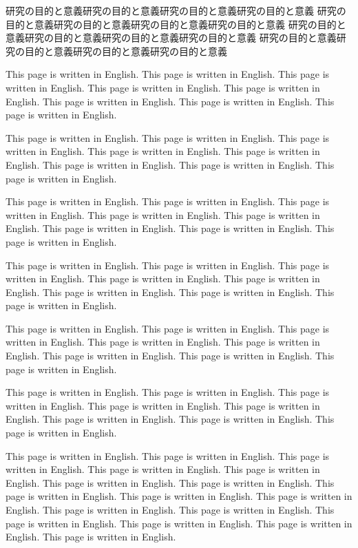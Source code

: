 \documentclass[12pt,dvipdfmx]{jarticle} %
\begin{document}
研究の目的と意義研究の目的と意義研究の目的と意義研究の目的と意義 
研究の目的と意義研究の目的と意義研究の目的と意義研究の目的と意義 
研究の目的と意義研究の目的と意義研究の目的と意義研究の目的と意義 
研究の目的と意義研究の目的と意義研究の目的と意義研究の目的と意義 


\newpage

This page is written in English. This page is written in English. 
This page is written in English. This page is written in English. 
This page is written in English. This page is written in English. 
This page is written in English. This page is written in English. 

This page is written in English. This page is written in English. 
This page is written in English. This page is written in English. 
This page is written in English. This page is written in English. 
This page is written in English. This page is written in English. 

This page is written in English. This page is written in English. 
This page is written in English. This page is written in English. 
This page is written in English. This page is written in English. 
This page is written in English. This page is written in English. 

This page is written in English. This page is written in English. 
This page is written in English. This page is written in English. 
This page is written in English. This page is written in English. 
This page is written in English. This page is written in English. 

This page is written in English. This page is written in English. 
This page is written in English. This page is written in English. 
This page is written in English. This page is written in English. 
This page is written in English. This page is written in English. 

This page is written in English. This page is written in English. 
This page is written in English. This page is written in English. 
This page is written in English. This page is written in English. 
This page is written in English. This page is written in English. 

This page is written in English. This page is written in English. 
This page is written in English. This page is written in English. 
This page is written in English. This page is written in English. 
This page is written in English. This page is written in English. 
This page is written in English. This page is written in English. 
This page is written in English. This page is written in English. 
This page is written in English. This page is written in English. 
This page is written in English. This page is written in English. 
\end{document}
